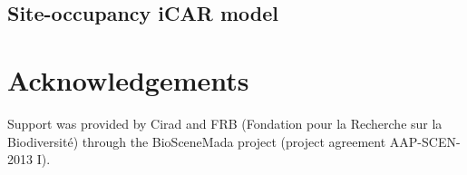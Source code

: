 \documentclass[a4paper, 12pt, leqno]{article}\usepackage[]{graphicx}\usepackage[]{color}
\begin{document}
\newpage

\subsection{Site-occupancy iCAR model}



\newpage

\section{Acknowledgements}

Support was provided by Cirad and FRB (Fondation pour la Recherche sur la Biodiversité)
through the BioSceneMada project (project agreement AAP-SCEN-2013 I).

\newpage



\end{document}
